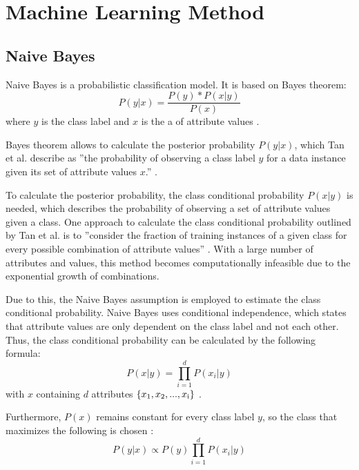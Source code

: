 \section{Machine Learning Method}
\subsection{Naive Bayes}

Naive Bayes is a probabilistic classification model. It is based on Bayes theorem:
\begin{equation}
\label{eq:bayes}
            P(y|x) = \frac{P(y) * P(x|y)}{P(x)}
\end{equation}
where $y$ is the class label and $x$ is the a of attribute values \cite{DBLP:books/aw/TanSKK2019}. 

Bayes theorem allows to calculate the posterior probability $P(y|x)$, which Tan et al. describe as ''the probability of observing a class label $y$ for a data instance given its set of attribute values $x$.'' \cite[p.~418]{DBLP:books/aw/TanSKK2019}. 

To calculate the posterior probability, the class conditional probability $P(x|y)$ is needed, which describes the probability of observing a set of attribute values given a class. One approach to calculate the class conditional probability outlined by Tan et al. is to ''consider the fraction of training instances of a given class for every possible combination of attribute values'' \cite[p.~419]{DBLP:books/aw/TanSKK2019}. With a large number of attributes and values, this method becomes computationally infeasible due to the exponential growth of combinations. \cite{DBLP:books/aw/TanSKK2019}

Due to this, the Naive Bayes assumption is employed to estimate the class conditional probability. Naive Bayes uses conditional independence, which states that attribute values are only dependent on the class label and not each other. Thus, the class conditional probability can be calculated by the following formula:
\begin{equation}
\label{eq:naive_assumption}
            P(x|y) = \prod_{i=1}^{d}P(x_{i}|y)
\end{equation}
with $x$ containing $d$ attributes $\{x\textsubscript{1},x\textsubscript{2},...,x\textsubscript{i}\}$ \cite{DBLP:books/aw/TanSKK2019}.

Furthermore, $P(x)$ remains constant for every class label $y$, so the class that maximizes the following is chosen \cite{DBLP:books/aw/TanSKK2019}:
\begin{equation}
\label{eq:naive_final}
            P(y|x)\propto P(y)\prod_{i=1}^{d}P(x_{i}|y) 
\end{equation}      










